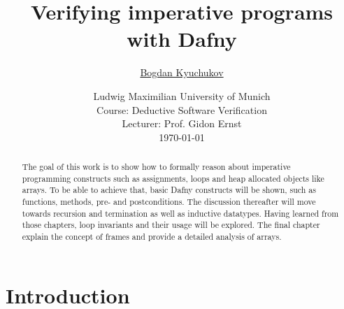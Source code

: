 \documentclass[a4paper]{article}
\begin{document}
\title{
	\vspace{1cm}
	\Huge Verifying imperative programs \\ with Dafny \\
}

\vspace{1cm}

\author{\Large \href{mailto:B.Kyuchukov@campus.lmu.de}{Bogdan Kyuchukov}
	\vspace{1cm}}

\date{
	\large Ludwig Maximilian University of Munich \\ Course: Deductive Software Verification \\
	\vspace{0.8cm}
	\large Lecturer: Prof. Gidon Ernst\\
	\vspace{1cm}
	\today
}

\maketitle
\setlength{\parindent}{0pt}

\vspace{2cm}
\begin{abstract}
	The goal of this work is to show how to formally reason about imperative programming constructs such as assignments,
	loops and heap allocated objects like arrays. To be able to achieve that, basic
	Dafny constructs will be shown, such as functions, methods, pre- and postconditions. The discussion thereafter will move
	towards recursion and termination as well as inductive datatypes. Having learned from those chapters,
	loop invariants and their usage will be explored. The final chapter explain the concept of frames and provide a
	detailed analysis of arrays.
\end{abstract}
\newpage
\tableofcontents
\newpage

\section{Introduction}
\label{sec:introduction}
\end{document}
